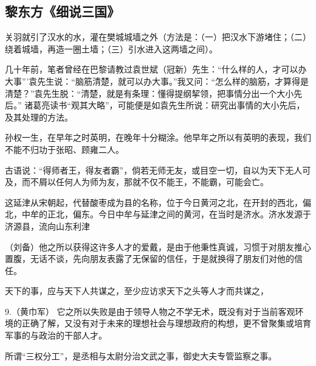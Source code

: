 \subsection{黎东方《细说三国》}
关羽就引了汉水的水，灌在樊城城墙之外（方法是：（一）把汉水下游堵住；（二）绕着城墙，再造一圈土墙；（三）引水进入这两墙之间）。

几十年前，笔者曾经在巴黎请教过袁世斌（冠新）先生：“什么样的人，才可以办大事”’袁先生说：“脑筋清楚，就可以办大事。”我又问：“怎么样的脑筋，才算得是清楚？”袁先生脱：“清楚，就是有条理：懂得提纲挈领，把事情分出一个大小先后。” 诸葛亮读书“观其大略”，可能便是如袁先生所说：研究出事情的大小先后，及其处理的方法。

孙权一生，在早年之时英明，在晚年十分糊涂。他早年之所以有英明的表现，我们不能不归功于张昭、顾雍二人。

古语说：“得师者王，得友者霸”，倘若无师无友，或目空一切，自以为天下无人可及，而不屑以任何人为师为友，那就不仅不能王，不能霸，可能会亡。

这延津从宋朝起，代替酸枣成为县的名称，位于今日黄河之北，在开封的西北，偏北，中牟的正北，偏东。今日中牟与延津之间的黄河，在当时是济水。济水发源于济源县，流向山东利津

（刘备）他之所以获得这许多人才的爱戴，是由于他秉性真诚，习惯于对朋友推心置腹，无话不谈，先向朋友表露了无保留的信任，于是就换得了朋友们对他的信任。

天下的事，应与天下人共谋之，至少应访求天下之头等人才而共谋之，

9.（黄巾军） 它之所以失败是由于领导人物之不学无术，既没有对于当前客观环境的正确了解，又没有对于未来的理想社会与理想政府的构想，更不曾聚集或培育军事的与政治的干部人才。

所谓“三权分工”，是丞相与太尉分治文武之事，御史大夫专管监察之事。